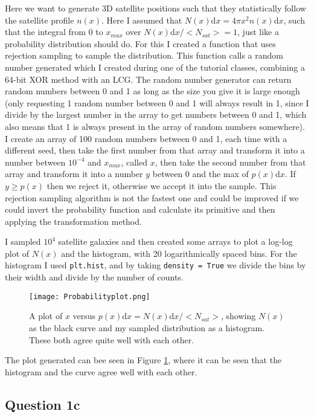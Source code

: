 Here we want to generate 3D satellite positions such that they statistically follow the satellite profile $n(x)$.
Here I assumed that $N(x)$d$x = 4\pi x^2 n(x)$d$x$, such that the integral from 0 to $x_{max}$ over $N(x)$d$x/<N_{sat}> = 1$, just like a probability distribution should do.
For this I created a function that uses rejection sampling to sample the distribution.
This function calls a random number generated which I created during one of the tutorial classes, combining a 64-bit XOR method with an LCG.
The random number generator can return random numbers between 0 and 1 as long as the size you give it is large enough (only requesting 1 random number between 0 and 1 will always result in 1, since I divide by the largest number in the array to get numbers between 0 and 1, which also means that 1 is always present in the array of random numbers somewhere).
I create an array of 100 random numbers between 0 and 1, each time with a different seed, then take the first number from that array and transform it into a number between $10^{-4}$ and $x_{max}$, called $x$, then take the second number from that array and transform it into a number $y$ between 0 and the max of $p(x)$d$x$.
If $y \geq p(x)$ then we reject it, otherwise we accept it into the sample.
This rejection sampling algorithm is not the fastest one and could be improved if we could invert the probability function and calculate its primitive and then applying the transformation method.

I sampled $10^4$ satellite galaxies and then created some arrays to plot a log-log plot of $N(x)$ and the histogram, with 20 logarithmically spaced bins.
For the histogram I used \texttt{plt.hist}, and by taking \texttt{density = True} we divide the bins by their width and divide by the number of counts.

\begin{figure}[ht!]
  \centering
  \texttt{[image: Probabilityplot.png]}
  \caption{A plot of $x$ versus $p(x)$d$x = N(x)$d$x/<N_{sat}>$, showing $N(x)$ as the black curve and my sampled distribution as a histogram. These both agree quite well with each other.}
  \label{fig:px}
\end{figure}

The plot generated can bee seen in Figure \ref{fig:px}, where it can be seen that the histogram and the curve agree well with each other.


\subsection{Question 1c}

